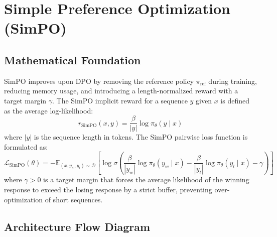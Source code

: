 \documentclass{article}
\begin{document}
\newpage
\section{Simple Preference Optimization (SimPO)}

\subsection{Mathematical Foundation}
SimPO improves upon DPO by removing the reference policy $\pi_{\text{ref}}$ during training, reducing memory usage, and introducing a length-normalized reward with a target margin $\gamma$.
The SimPO implicit reward for a sequence $y$ given $x$ is defined as the average log-likelihood:
\begin{equation}
  r_{\text{SimPO}}(x, y) = \frac{\beta}{|y|} \log \pi_\theta(y \mid x)
\end{equation}
where $|y|$ is the sequence length in tokens. The SimPO pairwise loss function is formulated as:
\begin{equation}
  \mathcal{L}_{\text{SimPO}}(\theta) = -\mathbb{E}_{(x, y_w, y_l) \sim \mathcal{D}} \left[ \log \sigma \left( \frac{\beta}{|y_w|} \log \pi_\theta(y_w \mid x) - \frac{\beta}{|y_l|} \log \pi_\theta(y_l \mid x) - \gamma \right) \right]
\end{equation}
where $\gamma > 0$ is a target margin that forces the average likelihood of the winning response to exceed the losing response by a strict buffer, preventing over-optimization of short sequences.

\subsection{Architecture Flow Diagram}
\end{document}
